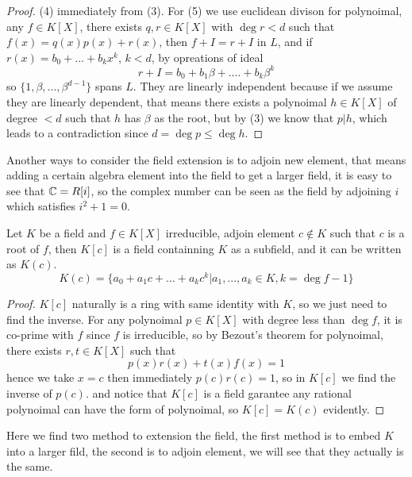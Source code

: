 \documentclass[en,geye,blue,normal,12pt]{elegantnote}
\begin{document}
\begin{proposition}
\begin{proof}
    (4) immediately from (3). For (5) we use euclidean divison for polynoimal, any \(f \in K[X]\), there exists \(q ,r \in K[X]\) with \(\deg r < d\) such that \( f(x) = q(x)p(x)+r(x)\), then \(f+ I = r + I\) in \(L\), and if \(r(x) = b_0+...+b_kx^k\), \(k < d\), by opreations of ideal
    \[r+I = b_0 + b_1\beta+....+ b_k\beta^k\]
    so \(\{1,\beta,...,\beta^{d-1}\} \) spans \(L\). They are linearly independent because if we assume they are linearly dependent, that means there exists a polynoimal \(h \in K[X]\) of degree \(< d\) such that \(h\) has \(\beta\) as the root, but by (3) we know that \(p | h\), which leads to a contradiction since \(d= \deg p \leq \deg h \).
  \end{proof}

\end{proposition}
Another ways to consider the field extension is to adjoin new element, that means adding a certain algebra element into the field to get a larger field, it is easy to see that \(\mathbb{C} = R[i]\), so the complex number can be seen as the field by adjoining \(i\) which satisfies \(i^2+1 = 0\).

\begin{proposition}
  Let \(K\) be a field and \(f \in K[X]\) irreducible, adjoin element \(c \notin K\) such that \(c\) is a root of \(f\), then \(K[c]\) is a field containning \(K\) as a subfield, and it can be written as \(K(c)\).
  \[K(c) = \{a_0+a_1c+...+a_kc^k| a_1,...,a_k \in K, k= \deg f-1\}\]
  \begin{proof}
    \(K[c]\) naturally is a ring with same identity with \(K\), so we just need to find the inverse. For any polynoimal \(p \in K[X]\) with degree less than \(\deg f\), it is co-prime with \(f\) since \(f\) is irreducible, so by Bezout's theorem for polynoimal, there exists \(r, t \in K[X]\) such that 
    \[p(x)r(x)+t(x)f(x) = 1\]
    hence we take \(x = c\) then immediately \(p(c)r(c) = 1\), so in \(K[c]\) we find the inverse of \(p(c)\). and notice that \(K[c]\) is a field garantee any rational polynoimal can have the form of polynoimal, so \(K[c] = K(c)\) evidently.
  \end{proof}
\end{proposition}

Here we find two method to extension the field, the first method is to embed \(K\) into a larger fild, the second is to adjoin element, we will see that they actually is the same.
\end{document}
